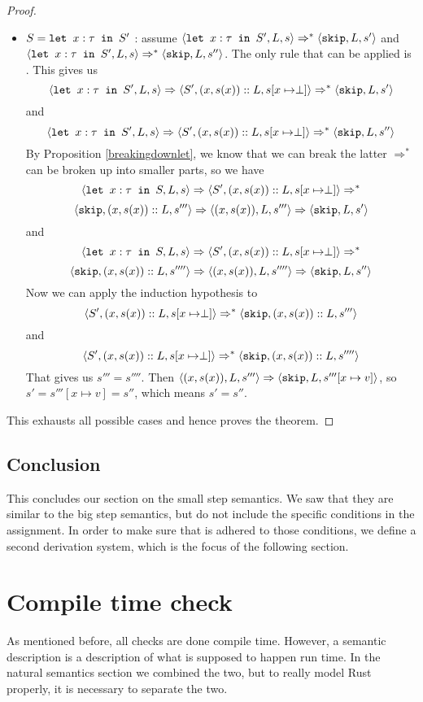 \begin{proof}
\begin{itemize}[noitemsep]
    \item $S = \texttt{let }x : \tau \texttt{ in } S'$ : assume $\langle \texttt{let }x : \tau \texttt{ in } S', L, s \rangle \Rightarrow ^{*} \langle \texttt{skip}, L, s' \rangle$ and $\langle \texttt{let }x : \tau \texttt{ in } S', L, s \rangle \Rightarrow ^{*} \langle \texttt{skip}, L, s'' \rangle$. The only rule that can be applied is . This gives us
    $$\langle \texttt{let }x : \tau \texttt{ in } S', L, s \rangle \Rightarrow \langle S', (x,s(x))::L, s[x\mapsto \perp] \rangle \Rightarrow ^{*} \langle \texttt{skip}, L, s' \rangle$$
    and 
    $$\langle \texttt{let }x : \tau \texttt{ in } S', L, s \rangle \Rightarrow \langle S', (x,s(x))::L, s[x\mapsto \perp] \rangle \Rightarrow ^{*} \langle \texttt{skip}, L, s'' \rangle$$
    By Proposition \ref{breakingdownlet}, we know that we can break the latter $\Rightarrow ^{*}$ can be broken up into smaller parts, so we have 
    $$\langle \texttt{let }x : \tau \texttt{ in } S, L, s \rangle \Rightarrow \langle S', (x,s(x))::L, s[x\mapsto \perp] \rangle \Rightarrow ^{*}$$ $$\langle \texttt{skip}, (x,s(x))::L, s''' \rangle \Rightarrow \langle (x,s(x)), L, s''' \rangle \Rightarrow \langle \texttt{skip}, L, s' \rangle$$
    and 
    $$\langle \texttt{let }x : \tau \texttt{ in } S, L, s \rangle \Rightarrow \langle S', (x,s(x))::L, s[x\mapsto \perp] \rangle \Rightarrow ^{*}$$ $$\langle \texttt{skip}, (x,s(x))::L, s'''' \rangle \Rightarrow \langle (x,s(x)), L, s'''' \rangle \Rightarrow \langle \texttt{skip}, L, s'' \rangle$$
    Now we can apply the induction hypothesis to 
    $$\langle S', (x,s(x))::L, s[x\mapsto \perp] \rangle \Rightarrow ^{*} \langle \texttt{skip}, (x,s(x))::L, s''' \rangle$$
    and 
    $$\langle S', (x,s(x))::L, s[x\mapsto \perp] \rangle \Rightarrow ^{*} \langle \texttt{skip}, (x,s(x))::L, s'''' \rangle$$
    That gives us $s''' = s''''$. Then $\langle (x,s(x)), L, s''' \rangle \Rightarrow \langle \texttt{skip}, L, s'''[x\mapsto v] \rangle$, so $s' = s'''[x\mapsto v] = s''$, which means $s'=s''$.
\end{itemize}
This exhausts all possible cases and hence proves the theorem.
\end{proof}

\subsection{Conclusion}
This concludes our section on the small step semantics. We saw that they are similar to the big step semantics, but do not include the specific conditions in the assignment. In order to make sure that is adhered to those conditions, we define a second derivation system, which is the focus of the following section. 

\section{Compile time check}
As mentioned before, all checks are done compile time. However, a semantic description is a description of what is supposed to happen run time. In the natural semantics section we combined the two, but to really model Rust properly, it is necessary to separate the two. 

